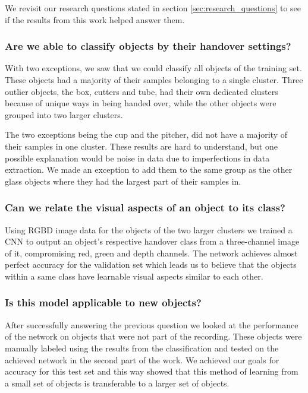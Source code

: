 We revisit our research questions stated in section \ref{sec:research_questions} to see if the results from this work helped answer them.

\subsubsection*{Are we able to classify objects by their handover settings?}

With two exceptions, we saw that we could classify all objects of the training set. These objects had a majority of their samples belonging to a single cluster. Three outlier objects, the box, cutters and tube, had their own dedicated clusters because of unique ways in being handed over, while the other objects were grouped into two larger clusters.

The two exceptions being the cup and the pitcher, did not have a majority of their samples in one cluster. These results are hard to understand, but one possible explanation would be noise in data due to imperfections in data extraction. We made an exception to add them to the same group as the other glass objects where they had the largest part of their samples in.


\subsubsection*{Can we relate the visual aspects of an object to its class?}

Using RGBD image data for the objects of the two larger clusters we trained a CNN to output an object's respective handover class from a three-channel image of it, compromising red, green and depth channels. The network achieves almost perfect accuracy for the validation set which leads us to believe that the objects within a same class have learnable visual aspects similar to each other.

\subsubsection*{Is this model applicable to new objects?}

After successfully answering the previous question we looked at the performance of the network on objects that were not part of the recording. These objects were manually labeled using the results from the classification and tested on the achieved network in the second part of the work. We achieved our goals for accuracy for this test set and this way showed that this method of learning from a small set of objects is transferable to a larger set of objects.


